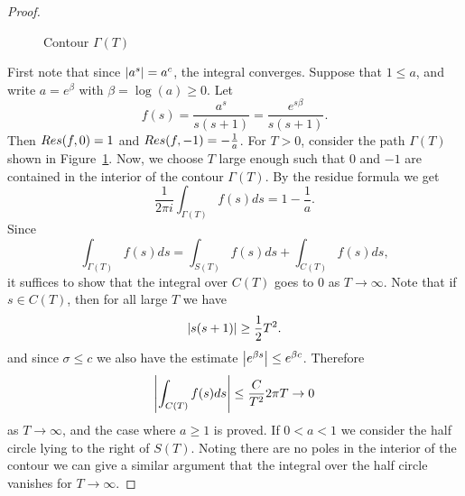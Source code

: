 \begin{proof}
\begin{figure}[!htb]
\begin{minipage}[c]{0.5\textwidth}
\end{minipage}
\caption{Contour $\Gamma(T)$}
\label{fig:ContourGamma}
\end{figure}
	First note that since $\left|a^s\right| = a^c$, the integral converges. Suppose that $1 \leq a$, and write $a = e^\beta$ with $\beta = \log(a) \geq 0$. Let
\begin{equation*}
	f(s) = \frac{a^s}{s(s + 1)} = \frac{e^{s \beta}}{s(s + 1)}.
\end{equation*}
	Then $\mathop{Res}(f, 0) = 1$ and $\mathop{Res}(f, -1) = -\frac{1}{a}$. For $T > 0$, consider the path $\Gamma(T)$ shown in Figure~\ref{fig:ContourGamma}. Now, we choose $T$ large enough such that $0$ and $-1$ are contained in the interior of the contour $\Gamma(T)$. By the residue formula we get
\begin{equation*}
	\frac{1}{2 \pi i} \int _{\Gamma(T)} f(s) ds = 1 - \frac{1}{a}.
\end{equation*}
	Since
\begin{equation*}
	\int _{\Gamma(T)} f(s) ds = \int _{S(T)} f(s) ds + \int _{C(T)} f(s) ds,
\end{equation*}
	it suffices to show that the integral over $C(T)$ goes to $0$ as $T \to \infty$. Note that if $s \in C(T)$, then for all large $T$ we have
\begin{equation*}
	\left|s(s + 1)\right| \geq \frac{1}{2} T^2.
\end{equation*}
	and since $\sigma \leq c$ we also have the estimate $\left|e^{\beta s}\right| \leq e^{\beta c}$. Therefore
\begin{equation*}
	\left|\int _{C(T)} f(s) ds\right| \leq \frac{C}{T^2} 2 \pi T \to 0
\end{equation*}
	as $T \to \infty$, and the case where $a \geq 1$ is proved. If $0 < a < 1$ we consider the half circle lying to the right of $S(T)$. Noting there are no poles in the interior of the contour we can give a similar argument that the integral over the half circle vanishes for $T \to \infty$.
\end{proof}


